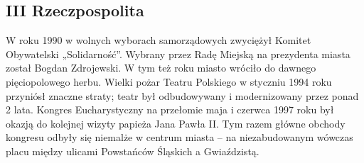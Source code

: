 \documentclass{article}
\begin{document}
\subsection{III Rzeczpospolita}
\vspace{3mm} %
\newline W roku 1990 w wolnych wyborach samorządowych zwyciężył Komitet Obywatelski „Solidarność”. Wybrany przez Radę Miejską na prezydenta miasta został Bogdan Zdrojewski. W tym też roku miasto wróciło do dawnego pięciopolowego herbu.
\vspace{3mm} %
\newline Wielki pożar Teatru Polskiego w styczniu 1994 roku przyniósł znaczne straty; teatr był odbudowywany i modernizowany przez ponad 2 lata.
\vspace{3mm} %
\newline Kongres Eucharystyczny na przełomie maja i czerwca 1997 roku był okazją do kolejnej wizyty papieża Jana Pawła II. Tym razem główne obchody kongresu odbyły się niemalże w centrum miasta – na niezabudowanym wówczas placu między ulicami Powstańców Śląskich a Gwiaździstą.
\end{document}
